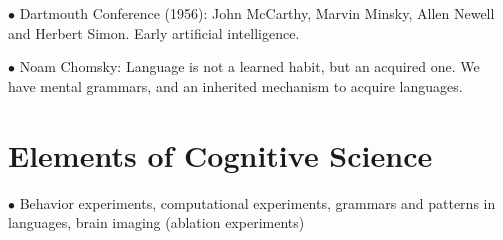 \documentclass[english,openany]{book}
\begin{document}
$\bullet$ Dartmouth Conference (1956): John McCarthy, Marvin Minsky, Allen Newell and Herbert Simon. Early artificial intelligence.

$\bullet$ Noam Chomsky: Language is not a learned habit, but an acquired one. We have mental grammars, and an inherited mechanism to acquire languages.

\section{Elements of Cognitive Science}

$\bullet$ Behavior experiments, computational experiments, grammars and patterns in languages, brain imaging (ablation experiments)
\end{document}
